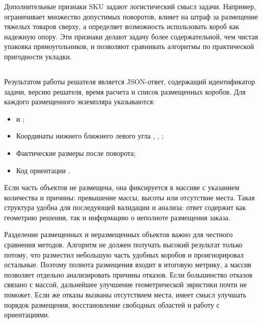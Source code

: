 Дополнительные признаки SKU задают логистический смысл задачи. Например,  ограничивает множество допустимых поворотов,  влияет на штраф за размещение тяжелых товаров сверху, а  определяет возможность использовать короб как надежную опору. Эти признаки делают задачу более содержательной, чем чистая упаковка прямоугольников, и позволяют сравнивать алгоритмы по практической пригодности укладки.

\subsection{}

Результатом работы решателя является JSON-ответ, содержащий идентификатор задачи, версию решателя, время расчета и список размещенных коробов. Для каждого размещенного экземпляра указываются:
\begin{itemize}
  \item {} и ;
  \item Координаты нижнего ближнего левого угла , , ;
  \item Фактические размеры после поворота;
  \item Код ориентации .
\end{itemize}

Если часть объектов не размещена, она фиксируется в массиве  с указанием количества и причины: превышение массы, высоты или отсутствие места. Такая структура удобна для последующей валидации и анализа: ответ содержит как геометрию решения, так и информацию о неполноте размещения заказа.

Разделение размещенных и неразмещенных объектов важно для честного сравнения методов. Алгоритм не должен получать высокий результат только потому, что разместил небольшую часть удобных коробов и проигнорировал остальные. Поэтому полнота размещения входит в итоговую метрику, а массив  позволяет отдельно анализировать причины отказов. Если большинство отказов связано с массой, дальнейшее улучшение геометрической эвристики почти не поможет. Если же отказы вызваны отсутствием места, имеет смысл улучшать порядок размещения, восстановление свободных областей и работу с ориентациями.

\subsection{}

